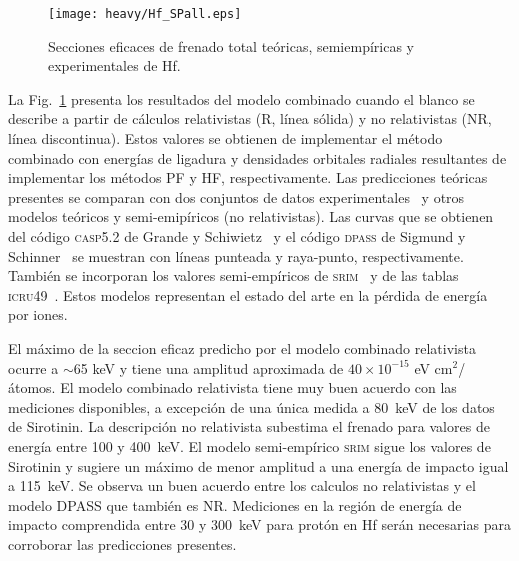 
\begin{figure}[t]
\centering
\texttt{[image: heavy/Hf\_SPall.eps]}
\caption[Secciones eficaces teóricas, semiempíricas y experimentales de 
Hf.]{Secciones eficaces de frenado total teóricas, semiempíricas y
experimentales de Hf.}
\label{fig:Hf_SPall}
\end{figure}

La Fig.~\ref{fig:Hf_SPall} presenta los resultados del modelo combinado 
cuando el blanco se describe a partir de cálculos relativistas (R, 
línea sólida) y no relativistas (NR, línea discontinua). Estos valores 
se obtienen de implementar el método combinado con energías de ligadura
y densidades orbitales radiales resultantes de implementar los métodos 
PF y HF, respectivamente. Las predicciones teóricas presentes se 
comparan con dos conjuntos de datos 
experimentales~\cite{Montanari:20,Sirotinin:84} y otros modelos teóricos 
y semi-emipíricos (no relativistas). Las curvas que se obtienen del 
código \textsc{casp5.2} de Grande y Schiwietz~\cite{Grande:01,casp52} y 
el código \textsc{dpass} de Sigmund y Schinner~\cite{DPASS20} se 
muestran con líneas punteada y raya-punto, respectivamente. También se 
incorporan los valores semi-empíricos de \textsc{srim}~\cite{Ziegler01} 
y de las tablas \textsc{icru49}~\cite{ICRU49}. Estos modelos representan
el estado del arte en la pérdida de energía por iones.

El máximo de la seccion eficaz predicho por el modelo combinado 
relativista ocurre a $\sim$65 keV y tiene una amplitud aproximada de 
$40\times 10^{-15}$ eV cm$^2$/átomos. 
El modelo combinado relativista tiene muy buen acuerdo con las 
mediciones disponibles, a excepción de una única medida a 80~keV de los 
datos de Sirotinin. La descripción no relativista subestima el frenado 
para valores de energía entre 100 y 400~keV. El modelo semi-empírico 
\textsc{srim} sigue los valores de Sirotinin y 
sugiere un máximo de menor amplitud a una energía de impacto igual a 
115~keV. 
Se observa un buen acuerdo entre los calculos no relativistas y el 
modelo DPASS que también es NR.
Mediciones en la región de energía de impacto comprendida entre 30 y 
300~keV para protón en Hf serán necesarias para corroborar las 
predicciones presentes. 

